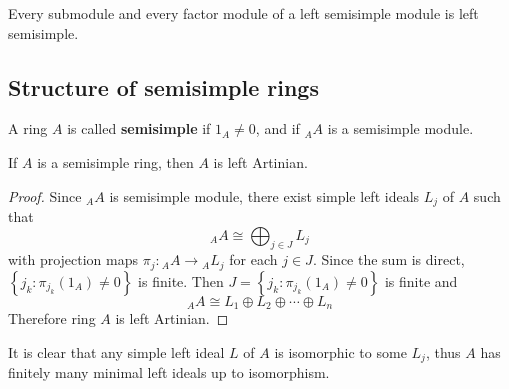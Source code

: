 \begin{proposition}
    Every submodule and every factor module of a left semisimple module is left semisimple.
\end{proposition}


\subsection{Structure of semisimple rings} %

\begin{definition}
    A ring $A$ is called \textbf{semisimple} if $1_A\neq 0$, and if ${}_A A$ is a semisimple module.
\end{definition}




\begin{proposition}
    If $A$ is a semisimple ring, then $A$ is left Artinian.
    \begin{proof}
        Since ${}_A A $ is semisimple module, there exist simple left ideals $L_j$ of $A$ such that
        \begin{equation*}
            {}_A A
            \cong
            \bigoplus_{j \in J} L_j
        \end{equation*}
        with projection maps $\pi_j:{}_A A \rightarrow {}_A L_j$ for each $j \in J$.
        Since the sum is direct, $\left\{j_k: \pi_{j_k}(1_A) \neq 0\right\}$ is finite.
        Then
        $J=\left\{j_k: \pi_{j_k}(1_A) \neq 0\right\}$ is finite and
        \begin{equation*}
            {}_A A
            \cong
            L_{1} \oplus L_{2} \oplus \cdots \oplus L_{n}
        \end{equation*}
        Therefore ring $A$ is left Artinian.
    \end{proof}
    \begin{remark}
        It is clear that any simple left ideal $L$ of $A$ is isomorphic to some $L_j$, thus $A$ has finitely many minimal left ideals up to isomorphism.
    \end{remark}
\end{proposition}



